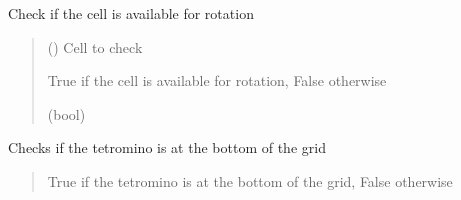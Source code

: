 \documentclass[letterpaper,10pt,english]{sphinxmanual}
\begin{document}
\begin{fulllineitems}

\begin{fulllineitems}
\label{\detokenize{tetris.tetrominos:tetris.tetrominos.Tetromino.TAG}}
\pysigstartsignatures
{}
\pysigstopsignatures
\end{fulllineitems}


\begin{fulllineitems}
\label{\detokenize{tetris.tetrominos:tetris.tetrominos.Tetromino.check_cell_available_for_rotation}}
\pysigstartsignatures
{}
\pysigstopsignatures
\sphinxAtStartPar
Check if the cell is available for rotation
\begin{quote}\begin{description}
\sphinxAtStartPar
{} (\sphinxstyleliteralemphasis{\sphinxupquote{{[}}}\sphinxstyleliteralemphasis{\sphinxupquote{{]}}}) \textendash{} Cell to check

\sphinxAtStartPar
True if the cell is available for rotation, False otherwise

\sphinxAtStartPar
(bool)

\end{description}\end{quote}

\end{fulllineitems}


\begin{fulllineitems}
\label{\detokenize{tetris.tetrominos:tetris.tetrominos.Tetromino.check_down}}
\pysigstartsignatures
{}
\pysigstopsignatures
\sphinxAtStartPar
Checks if the tetromino is at the bottom of the grid
\begin{quote}\begin{description}
\sphinxAtStartPar
True if the tetromino is at the bottom of the grid, False otherwise


\end{description}
\end{quote}
\end{fulllineitems}
\end{fulllineitems}
\end{document}
